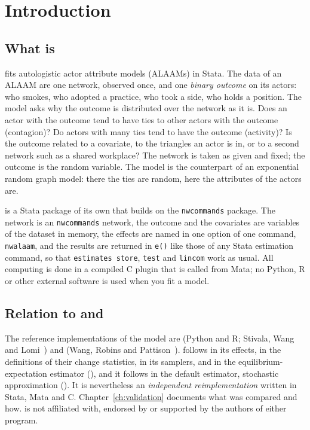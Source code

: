 \chapter{Introduction}\label{ch:intro}

\section{What \texorpdfstring{\nwalaam}{nwalaam} is}

\nwalaam{} fits autologistic actor attribute models (ALAAMs) in Stata. The data of an ALAAM are one network, observed once, and one \emph{binary outcome} on its actors: who smokes, who adopted a practice, who took a side, who holds a position. The model asks why the outcome is distributed over the network as it is. Does an actor with the outcome tend to have ties to other actors with the outcome (contagion)? Do actors with many ties tend to have the outcome (activity)? Is the outcome related to a covariate, to the triangles an actor is in, or to a second network such as a shared workplace? The network is taken as given and fixed; the outcome is the random variable. The model is the counterpart of an exponential random graph model: there the ties are random, here the attributes of the actors are.

\nwalaam{} is a Stata package of its own that builds on the \texttt{nwcommands} package. The network is an \texttt{nwcommands} network, the outcome and the covariates are variables of the dataset in memory, the effects are named in one option of one command, \texttt{nwalaam}, and the results are returned in \texttt{e()} like those of any Stata estimation command, so that \texttt{estimates store}, \texttt{test} and \texttt{lincom} work as usual. All computing is done in a compiled C plugin that is called from Mata; no Python, R or other external software is used when you fit a model.

\section{Relation to \texorpdfstring{\alaamee}{ALAAMEE} and \texorpdfstring{\mpnet}{MPNet}}

The reference implementations of the model are \alaamee{} (Python and R; Stivala, Wang and Lomi~\cite{stivala2024}) and \mpnet{} (Wang, Robins and Pattison~\cite{wang2009}). \nwalaam{} follows \alaamee{} in its effects, in the definitions of their change statistics, in its samplers, and in the equilibrium-expectation estimator (), and it follows \mpnet{} in the default estimator, stochastic approximation (). It is nevertheless an \emph{independent reimplementation} written in Stata, Mata and C. Chapter~\ref{ch:validation} documents what was compared and how. \nwalaam{} is not affiliated with, endorsed by or supported by the authors of either program.

